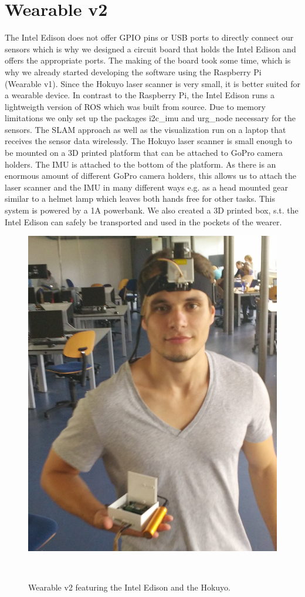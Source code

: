 \documentclass{sigchi-ext}
\begin{document}
\section{Wearable v2}
The Intel Edison does not offer GPIO pins or USB ports to directly connect our sensors which is why we designed a circuit board that holds the Intel Edison and offers the appropriate ports. The making of the board took some time, which is why we already started developing the software using the Raspberry Pi (Wearable v1). Since the Hokuyo laser scanner is very small, it is better suited for a wearable device. In contrast to the Raspberry Pi, the Intel Edison runs a lightweigth version of ROS which was built from source. Due to memory limitations we only set up the packages i2c\_imu and urg\_node necessary for the sensors.
The SLAM approach as well as the visualization run on a laptop that receives the sensor data wirelessly. The Hokuyo laser scanner is small enough to be mounted on a 3D printed platform that can be attached to GoPro camera holders. The IMU is attached to the bottom of the platform. As there is an enormous amount of different GoPro camera holders, this allows us to attach the laser scanner and the IMU in many different ways e.g. as a head mounted gear similar to a helmet lamp which leaves both hands free for other tasks. This system is powered by a 1A powerbank. We also created a 3D printed box, s.t. the Intel Edison can safely be transported and used in the pockets of the wearer. 

\begin{figure}[!h]
  \includegraphics[width=0.9\columnwidth]{edison-hokuyo.jpg}
  \caption{Wearable v2 featuring the Intel Edison and the Hokuyo.}~\label{fig:v2}
\end{figure}
\end{document}
